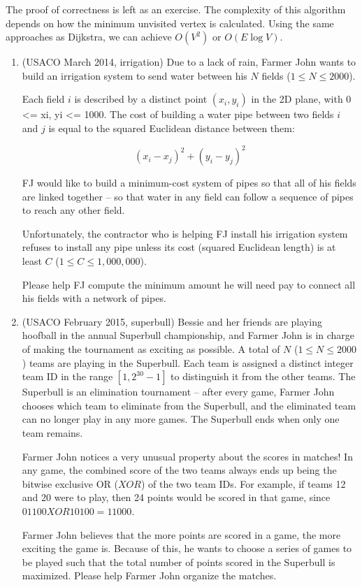 \documentclass[11pt]{book}
\begin{document}
The proof of correctness is left as an exercise. The complexity of this algorithm depends on how the minimum unvisited vertex is calculated. Using the same approaches as Dijkstra, we can achieve $O(V^2)$ or $O(E \log{V})$.

\begin{enumerate}

\item
(USACO March 2014, irrigation)
Due to a lack of rain, Farmer John wants to build an irrigation system to
send water between his $N$ fields ($1 \le N \le 2000$).

Each field $i$ is described by a distinct point $(x_i, y_i)$ in the 2D plane,
with 0 <= xi, yi <= 1000.  The cost of building a water pipe between two
fields $i$ and $j$ is equal to the squared Euclidean distance between them: 

\[(x_i - x_j)^2 + (y_i - y_j)^2\]

FJ would like to build a minimum-cost system of pipes so that all of his
fields are linked together -- so that water in any field can follow a
sequence of pipes to reach any other field.  

Unfortunately, the contractor who is helping FJ install his irrigation
system refuses to install any pipe unless its cost (squared Euclidean
length) is at least $C$ ($1 \le C \le 1,000,000$).  

Please help FJ compute the minimum amount he will need pay to connect all
his fields with a network of pipes.

\item
(USACO February 2015, superbull)
Bessie and her friends are playing hoofball in the annual Superbull championship, and Farmer John is in charge of making the tournament as exciting as possible. A total of $N$ ($1 \le N \le 2000$) teams are playing in the Superbull. Each team is assigned a distinct integer team ID in the range $[1,2^{30}-1]$ to distinguish it from the other teams. The Superbull is an elimination tournament -- after every game, Farmer John chooses which team to eliminate from the Superbull, and the eliminated team can no longer play in any more games. The Superbull ends when only one team remains.

Farmer John notices a very unusual property about the scores in matches! In any game, the combined score of the two teams always ends up being the bitwise exclusive OR ($XOR$) of the two team IDs. For example, if teams 12 and 20 were to play, then 24 points would be scored in that game, since $01100 XOR 10100 = 11000$.

Farmer John believes that the more points are scored in a game, the more exciting the game is. Because of this, he wants to choose a series of games to be played such that the total number of points scored in the Superbull is maximized. Please help Farmer John organize the matches.

\end{enumerate}
\end{document}
